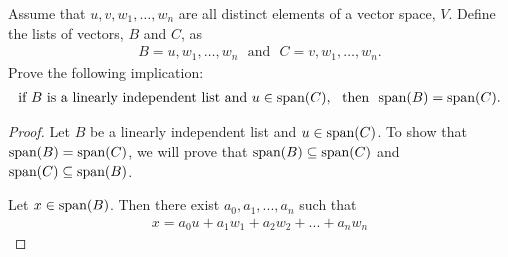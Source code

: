 \begin{question}\label{que:SpanAgain}
    \normalfont

    Assume that  $u,v,w_1,\dots,w_n$ are all distinct elements of a vector space, $V$.  Define the lists of vectors, $B$ and $C$, as
    \begin{align*}
        B =  u, w_1,\dots, w_n \ \ \ \text{and}\ \ \
        C =  v, w_1,\dots, w_n .
    \end{align*}
    Prove the following implication:
    \begin{align*}
        \text{if}\ B\ \text{is a linearly independent list and}\  u\in\textnormal{span}(C),\ \ \text{then}\ \ \textnormal{span}(B)=\textnormal{span}(C).
    \end{align*}
\end{question}

\renewcommand{\qedsymbol}{$\blacksquare$}
\begin{proof}
    Let $B$ be a linearly independent list and $u\in\textnormal{span}(C)$. To show that $\textnormal{span}(B)=\textnormal{span}(C)$, we will prove that $\textnormal{span}(B)\subseteq\textnormal{span}(C)$ and $\textnormal{span}(C)\subseteq\textnormal{span}(B)$. 

    Let $x\in\textnormal{span}(B)$. Then there exist $a_0,a_1,...,a_n$ such that 
    \[
        \begin{aligned}
            x=a_0u+a_1w_1+a_2w_2+...+a_nw_n
        \end{aligned}
    \]

\end{proof}